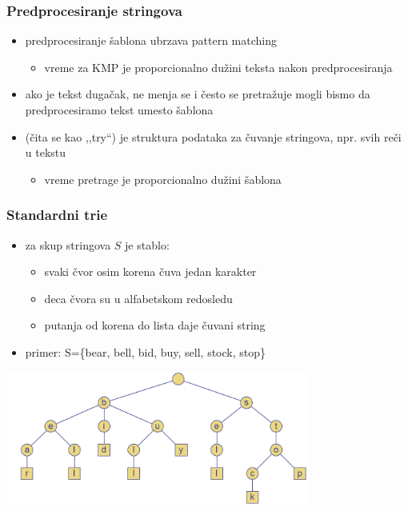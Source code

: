 \documentclass[compress]{beamer}
\begin{document}
\begin{frame}[fragile]
  \frametitle{Predprocesiranje stringova}
  \begin{itemize}
    \item predprocesiranje šablona ubrzava pattern matching
    \begin{itemize}
      \item vreme za KMP je proporcionalno dužini teksta nakon predprocesiranja
    \end{itemize}
    \item ako je tekst dugačak, ne menja se i često se pretražuje mogli bismo
    da predprocesiramo tekst umesto šablona
    \item {} (čita se kao ,,try``) je struktura podataka za čuvanje
    stringova, npr. svih reči u tekstu
    \begin{itemize}
      \item vreme pretrage je proporcionalno dužini šablona
    \end{itemize}
  \end{itemize}
\end{frame}

\begin{frame}[fragile]
  \frametitle{Standardni trie}
  \begin{itemize}
    \item {} za skup stringova $S$ je stablo:
    \begin{itemize}
      \item svaki čvor osim korena čuva jedan karakter
      \item deca čvora su u alfabetskom redosledu
      \item putanja od korena do lista daje čuvani string
    \end{itemize}
    \item primer: S=\{bear, bell, bid, buy, sell, stock, stop\}
  \end{itemize}
  \begin{center}
    \includegraphics[width=10cm]{asp-13-pic18.png}
  \end{center}
\end{frame}
\end{document}
